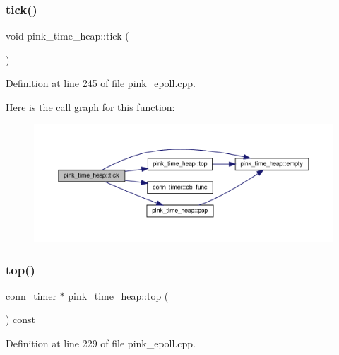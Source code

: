 \subsubsection{\texorpdfstring{tick()}{tick()}}
{\footnotesize\ttfamily void pink\+\_\+time\+\_\+heap\+::tick (\begin{DoxyParamCaption}{ }\end{DoxyParamCaption})}



Definition at line 245 of file pink\+\_\+epoll.\+cpp.

Here is the call graph for this function\+:\nopagebreak
\begin{figure}[H]
\begin{center}
\leavevmode
\includegraphics[width=350pt]{classpink__time__heap_a9193dc948c6bb00005bf6639f2169b57_cgraph}
\end{center}
\end{figure}
\mbox{\label{classpink__time__heap_ac0932b13390241373290a321ecf16600}} 
\subsubsection{\texorpdfstring{top()}{top()}}
{\footnotesize\ttfamily \hyperlink{classconn__timer}{conn\+\_\+timer} $\ast$ pink\+\_\+time\+\_\+heap\+::top (\begin{DoxyParamCaption}{ }\end{DoxyParamCaption}) const}



Definition at line 229 of file pink\+\_\+epoll.\+cpp.

